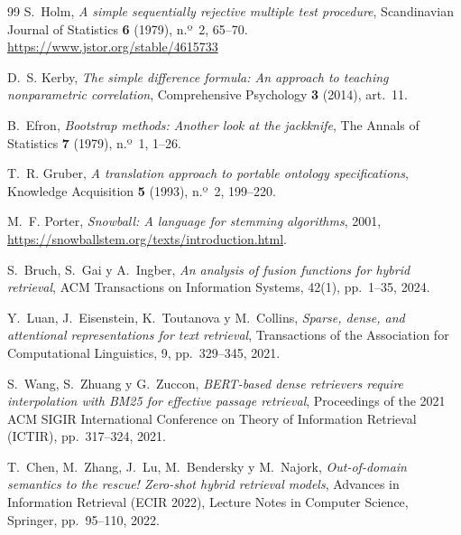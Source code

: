 \documentclass[11pt,letterpaper]{article}
\numberwithin{equation}{section}
\begin{document}
\begin{thebibliography}{99}
S.~Holm,
\textit{A simple sequentially rejective multiple test procedure},
Scandinavian Journal of Statistics \textbf{6} (1979), n.º~2, 65--70.
\url{https://www.jstor.org/stable/4615733}

D.~S. Kerby,
\textit{The simple difference formula: An approach to teaching nonparametric correlation},
Comprehensive Psychology \textbf{3} (2014), art.~11.

B.~Efron,
\textit{Bootstrap methods: Another look at the jackknife},
The Annals of Statistics \textbf{7} (1979), n.º~1, 1--26.

T.~R. Gruber,
\textit{A translation approach to portable ontology specifications},
Knowledge Acquisition \textbf{5} (1993), n.º~2, 199--220.

M.~F. Porter,
\textit{Snowball: A language for stemming algorithms},
2001, \url{https://snowballstem.org/texts/introduction.html}.

S.~Bruch, S.~Gai y A.~Ingber,
\textit{An analysis of fusion functions for hybrid retrieval},
ACM Transactions on Information Systems, 42(1), pp.~1--35, 2024.

Y.~Luan, J.~Eisenstein, K.~Toutanova y M.~Collins,
\textit{Sparse, dense, and attentional representations for text retrieval},
Transactions of the Association for Computational Linguistics, 9, pp.~329--345, 2021.

S.~Wang, S.~Zhuang y G.~Zuccon,
\textit{{BERT}-based dense retrievers require interpolation with {BM25} for effective passage retrieval},
Proceedings of the 2021 ACM SIGIR International Conference on Theory of Information Retrieval (ICTIR), pp.~317--324, 2021.

T.~Chen, M.~Zhang, J.~Lu, M.~Bendersky y M.~Najork,
\textit{Out-of-domain semantics to the rescue! Zero-shot hybrid retrieval models},
Advances in Information Retrieval (ECIR 2022), Lecture Notes in Computer Science, Springer, pp.~95--110, 2022.


\end{thebibliography}
\end{document}
